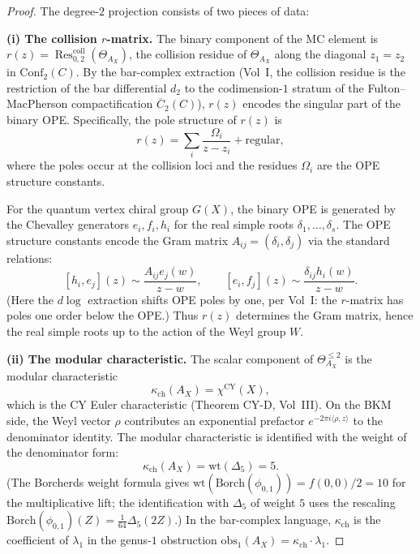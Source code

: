 \documentclass[11pt]{amsart}
\theoremstyle{definition}
\theoremstyle{remark}
\DeclareMathOperator{\Res}{Res}
\begin{document}
\begin{proof}
The degree-$2$ projection consists of two pieces of data:

\medskip
\noindent\textbf{(i) The collision $r$-matrix.}
The binary component of the MC element is
$r(z) = \Res^{\mathrm{coll}}_{0,2}(\Theta_{A_X})$, the
collision residue of $\Theta_{A_X}$ along the diagonal
$z_1 = z_2$ in $\mathrm{Conf}_2(C)$. By the bar-complex
extraction (Vol~I, the collision residue is the restriction
of the bar differential $d_2$ to the codimension-$1$ stratum
of the Fulton--MacPherson compactification $\overline{C}_2(C)$),
$r(z)$ encodes the singular part of the binary OPE\@.
Specifically, the pole structure of $r(z)$ is
\[
 r(z) = \sum_i \frac{\Omega_i}{z - z_i} + \text{regular},
\]
where the poles occur at the collision loci and the residues
$\Omega_i$ are the OPE structure constants.

For the quantum vertex chiral group $G(X)$, the binary OPE
is generated by the Chevalley generators $e_i, f_i, h_i$
for the real simple roots $\delta_1, \ldots, \delta_s$. The
OPE structure constants encode the Gram matrix
$A_{ij} = (\delta_i, \delta_j)$ via the standard relations:
\[
 [h_i, e_j](z) \sim \frac{A_{ij} e_j(w)}{z - w}, \qquad
 [e_i, f_j](z) \sim \frac{\delta_{ij} h_i(w)}{z - w}.
\]
(Here the $d\log$ extraction shifts OPE poles by one, per
Vol~I: the $r$-matrix has poles one order below the
OPE\@.) Thus $r(z)$ determines the Gram matrix, hence the
real simple roots up to the action of the Weyl group $W$.

\medskip
\noindent\textbf{(ii) The modular characteristic.}
The scalar component of $\Theta^{\leq 2}_{A_X}$ is the modular
characteristic
\[
 \kappa_{\mathrm{ch}}(A_X) = \chi^{\mathrm{CY}}(X),
\]
which is the CY Euler characteristic (Theorem CY-D, Vol~III).
On the BKM side, the Weyl vector $\rho$ contributes an
exponential prefactor $e^{-2\pi i \langle \rho, z \rangle}$ to
the denominator identity. The modular characteristic is
identified with the weight of the denominator form:
\begin{equation}\label{eq:kappa-rho}
 \kappa_{\mathrm{ch}}(A_X) = \mathrm{wt}(\Delta_5) = 5.
\end{equation}
(The Borcherds weight formula gives
$\mathrm{wt}(\mathrm{Borch}(\phi_{0,1})) = f(0,0)/2 = 10$
for the multiplicative lift; the identification with $\Delta_5$
of weight $5$ uses the rescaling
$\mathrm{Borch}(\phi_{0,1})(Z) = \tfrac{1}{64}\Delta_5(2Z)$.)
In the bar-complex language, $\kappa_{\mathrm{ch}}$ is the coefficient of
$\lambda_1$ in the genus-$1$ obstruction
$\mathrm{obs}_1(A_X) = \kappa_{\mathrm{ch}} \cdot \lambda_1$.


\end{proof}
\end{document}
